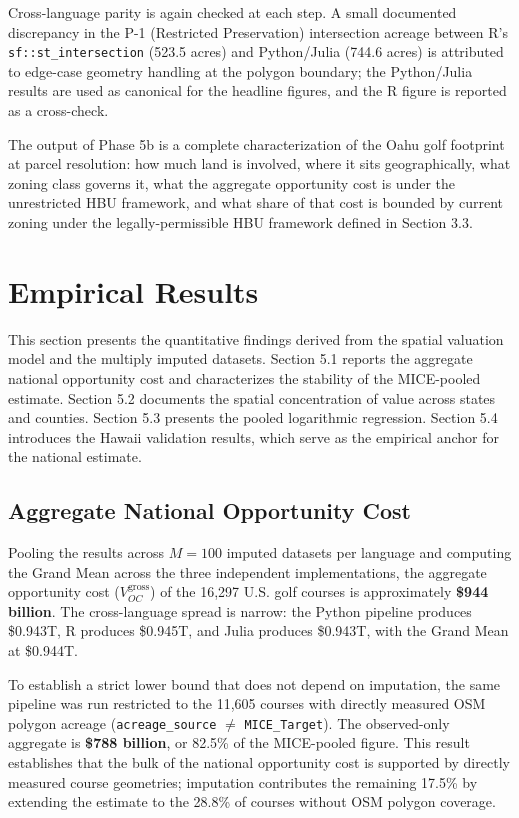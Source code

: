 \documentclass[11pt, letterpaper]{article}
\begin{document}
\noindent Cross-language parity is again checked at each step. A small documented discrepancy in the P-1 (Restricted Preservation) intersection acreage between R's \texttt{sf::st\_intersection} (523.5 acres) and Python/Julia (744.6 acres) is attributed to edge-case geometry handling at the polygon boundary; the Python/Julia results are used as canonical for the headline figures, and the R figure is reported as a cross-check.

The output of Phase 5b is a complete characterization of the Oahu golf footprint at parcel resolution: how much land is involved, where it sits geographically, what zoning class governs it, what the aggregate opportunity cost is under the unrestricted HBU framework, and what share of that cost is bounded by current zoning under the legally-permissible HBU framework defined in Section 3.3.

\newpage

\section{Empirical Results}

This section presents the quantitative findings derived from the spatial valuation model and the multiply imputed datasets. Section 5.1 reports the aggregate national opportunity cost and characterizes the stability of the MICE-pooled estimate. Section 5.2 documents the spatial concentration of value across states and counties. Section 5.3 presents the pooled logarithmic regression. Section 5.4 introduces the Hawaii validation results, which serve as the empirical anchor for the national estimate.

\subsection{Aggregate National Opportunity Cost}

Pooling the results across $M = 100$ imputed datasets per language and computing the Grand Mean across the three independent implementations, the aggregate opportunity cost ($V_{OC}^{\text{gross}}$) of the 16,297 U.S. golf courses is approximately \textbf{\$944 billion}. The cross-language spread is narrow: the Python pipeline produces \$0.943T, R produces \$0.945T, and Julia produces \$0.943T, with the Grand Mean at \$0.944T.

To establish a strict lower bound that does not depend on imputation, the same pipeline was run restricted to the 11,605 courses with directly measured OSM polygon acreage (\texttt{acreage\_source} $\neq$ \texttt{MICE\_Target}). The observed-only aggregate is \textbf{\$788 billion}, or 82.5\% of the MICE-pooled figure. This result establishes that the bulk of the national opportunity cost is supported by directly measured course geometries; imputation contributes the remaining 17.5\% by extending the estimate to the 28.8\% of courses without OSM polygon coverage.
\end{document}
